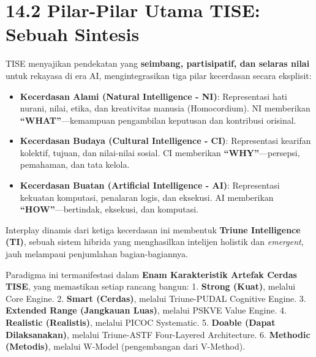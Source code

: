 \documentclass[
  letterpaper,
  DIV=11,
  numbers=noendperiod]{scrreprt}
\providecommand{\tightlist}{%
  \setlength{\itemsep}{0pt}\setlength{\parskip}{0pt}}
\begin{document}
\section{\texorpdfstring{\textbf{14.2 Pilar-Pilar Utama TISE: Sebuah
Sintesis}}{14.2 Pilar-Pilar Utama TISE: Sebuah Sintesis}}\label{pilar-pilar-utama-tise-sebuah-sintesis}

TISE menyajikan pendekatan yang \textbf{seimbang, partisipatif, dan
selaras nilai} untuk rekayasa di era AI, mengintegrasikan tiga pilar
kecerdasan secara eksplisit:

\begin{itemize}
\tightlist
\item
  \textbf{Kecerdasan Alami (Natural Intelligence - NI)}: Representasi
  hati nurani, nilai, etika, dan kreativitas manusia (Homocordium). NI
  memberikan \textbf{``WHAT''}---kemampuan pengambilan keputusan dan
  kontribusi orisinal.
\item
  \textbf{Kecerdasan Budaya (Cultural Intelligence - CI)}: Representasi
  kearifan kolektif, tujuan, dan nilai-nilai sosial. CI memberikan
  \textbf{``WHY''}---persepsi, pemahaman, dan tata kelola.
\item
  \textbf{Kecerdasan Buatan (Artificial Intelligence - AI)}:
  Representasi kekuatan komputasi, penalaran logis, dan eksekusi. AI
  memberikan \textbf{``HOW''}---bertindak, eksekusi, dan komputasi.
\end{itemize}

Interplay dinamis dari ketiga kecerdasan ini membentuk \textbf{Triune
Intelligence (TI)}, sebuah sistem hibrida yang menghasilkan intelijen
holistik dan \emph{emergent}, jauh melampaui penjumlahan
bagian-bagiannya.

Paradigma ini termanifestasi dalam \textbf{Enam Karakteristik Artefak
Cerdas TISE}, yang memastikan setiap rancang bangun: 1. \textbf{Strong
(Kuat)}, melalui Core Engine. 2. \textbf{Smart (Cerdas)}, melalui
Triune-PUDAL Cognitive Engine. 3. \textbf{Extended Range (Jangkauan
Luas)}, melalui PSKVE Value Engine. 4. \textbf{Realistic (Realistis)},
melalui PICOC Systematic. 5. \textbf{Doable (Dapat Dilaksanakan)},
melalui Triune-ASTF Four-Layered Architecture. 6. \textbf{Methodic
(Metodis)}, melalui W-Model (pengembangan dari V-Method).
\end{document}
